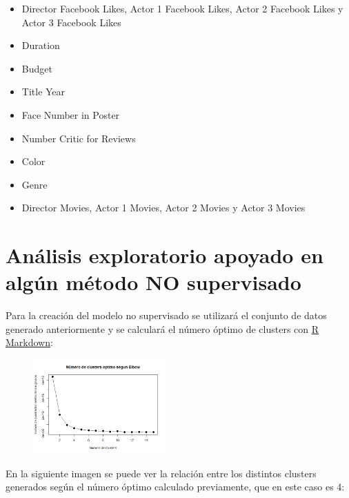 \documentclass{article}
\begin{document}
\begin{itemize}
  \item Director Facebook Likes, Actor 1 Facebook Likes, Actor 2 Facebook Likes y Actor 3 Facebook Likes
  \item Duration
  \item Budget
  \item Title Year
  \item Face Number in Poster
  \item Number Critic for Reviews
  \item Color
  \item Genre
  \item Director Movies, Actor 1 Movies, Actor 2 Movies y Actor 3 Movies
\end{itemize}

\clearpage

\section{Análisis exploratorio apoyado en algún método NO supervisado}

Para la creación del modelo no supervisado se utilizará el conjunto de datos generado anteriormente y se calculará el número óptimo de clusters con \href{https://github.com/pozueco/proyecto_fin_de_master/blob/master/model_no_supervised.md}{R Markdown}:

\begin{figure}[h]
\centering
\includegraphics[width=2in,clip,keepaspectratio]{./model_no_supervised_files/figure-markdown_github/unnamed-chunk-2-1}
\end{figure}

En la siguiente imagen se puede ver la relación entre los distintos clusters generados según el número óptimo calculado previamente, que en este caso es 4:
\end{document}
